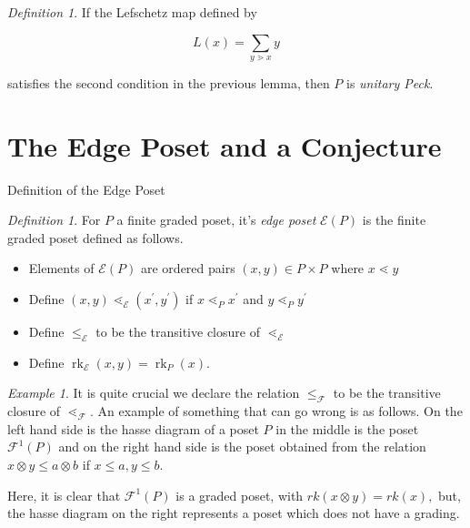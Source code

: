 \documentclass{beamer}
\theoremstyle{remark}
\newtheorem{eg}[thm]{Example}
\newtheorem{defn}[thm]{Definition}
\newcommand\rk{\operatorname{rk}}
\begin{document}
\begin{frame}
\begin{defn}
If the Lefschetz map defined by

$$L(x) = \sum_{y\gtrdot x} y$$

satisfies the second condition in the previous lemma, then $P$ is \textit{unitary Peck}.
\end{defn}
\end{frame}








\section{The Edge Poset and a Conjecture}

\begin{frame}{Definition of the Edge Poset}
\begin{defn}
\label{defn:functor_of_edges}
For $P$ a finite graded poset, it's \textit{edge poset} $\mathcal{E}(P)$ is the finite graded poset defined as follows. 
\begin{itemize}

\item Elements of $\mathcal{E}(P)$ are ordered pairs $(x,y)\in P\times P$ where $x\lessdot y$

\item Define $(x,y) \lessdot_{\mathcal{E}} (x^\prime,y^\prime)$ if $x\lessdot_P x^\prime$ and $y\lessdot_P y^\prime$

\item Define $\le_{\mathcal{E}}$ to be the transitive closure of $\lessdot_{\mathcal{E}}$

\item Define $\rk_{\mathcal{E}}(x,y) = \rk_P(x)$.
\end{itemize}
\end{defn}
\end{frame}







\begin{frame}
\begin{eg}
It is quite crucial we declare the relation $\leq_\mathcal F$ to be the transitive closure of $\lessdot_{\mathcal F}.$ An example of something that can go wrong is as follows. On the left hand side is the hasse diagram of a poset $P$ in the middle is the poset $\mathcal F^1(P)$ and on the right hand side is the poset obtained from the relation $x\otimes y \leq a\otimes b$ if $x \leq a, y \leq b.$

Here, it is clear that $\mathcal F^1(P)$ is a graded poset, with $rk(x\otimes y) = rk(x),$ but, the hasse diagram on the right represents a poset which does not have a grading.
\end{eg}

\end{frame}
\end{document}
